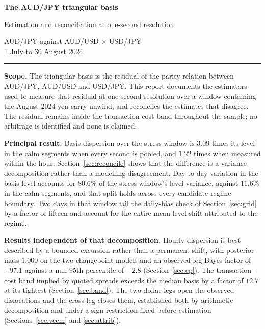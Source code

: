 \documentclass[11pt,a4paper]{article}
\begin{document}
\thispagestyle{empty}
\vspace*{2.2cm}

{\Huge\bfseries The AUD/JPY triangular basis\par}
\vspace{10pt}
{\Large Estimation and reconciliation at one-second resolution\par}

\vspace{16pt}
{\large AUD/JPY against AUD/USD $\times$ USD/JPY\\
1 July to 30 August 2024\par}

\vspace{2.2cm}
\hrule
\vspace{16pt}

\textbf{Scope.} The triangular basis is the residual of the parity relation between
AUD/JPY, AUD/USD and USD/JPY. This report documents the estimators used to measure that
residual at one-second resolution over a window containing the August 2024 yen carry
unwind, and reconciles the estimates that disagree. The residual remains inside the
transaction-cost band throughout the sample; no arbitrage is identified and none is
claimed.

\textbf{Principal result.} Basis dispersion over the stress window is $3.09$ times its
level in the calm segments when every second is pooled, and $1.22$ times when measured
within the hour. Section~\ref{sec:reconcile} shows that the difference is a variance
decomposition rather than a modelling disagreement. Day-to-day variation in the basis level
accounts for $80.6\%$ of the stress window's level variance, against $11.6\%$ in the calm
segments, and that split holds across every candidate regime boundary. Two days in that window fail the daily-bias check of
Section~\ref{sec:grid} by a factor of fifteen and account for the entire mean level shift
attributed to the regime.

\textbf{Results independent of that decomposition.} Hourly dispersion is best described by
a bounded excursion rather than a permanent shift, with posterior mass $1.000$ on the
two-changepoint models and an observed log Bayes factor of $+97.1$ against a null 95th
percentile of $-2.8$ (Section~\ref{sec:cp}). The transaction-cost band implied by quoted
spreads exceeds the median basis by a factor of $12.7$ at its tightest
(Section~\ref{sec:band}). The two dollar legs open the observed dislocations and the cross
leg closes them, established both by arithmetic decomposition and under a sign restriction
fixed before estimation (Sections~\ref{sec:vecm} and \ref{sec:attrib}).
\end{document}
